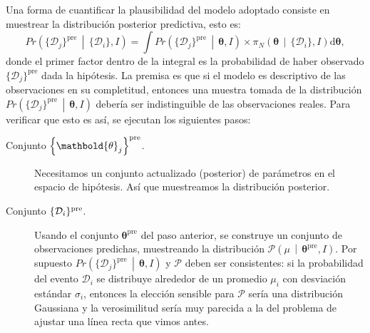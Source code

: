 \documentclass[a4paper,twoside]{article}
\newcommand{\hip}{\ensuremath{\mathbold{\theta}}\xspace}
\newcommand{\dat}[1][i]{\ensuremath{\{\mathcal{D}_{#1}\}}\xspace}
\newcommand{\pos}[2]{\ensuremath{\pi_N\left(#1\,\middle|\, #2\right)}\xspace}
\newcommand{\pro}[2]{\ensuremath{Pr\left(#1\,\middle|\, #2\right)}\xspace}
\newcommand{\set}[1]{\ensuremath{\left\{#1\right\}}\xspace}
\begin{document}
Una forma de cuantificar la plausibilidad del modelo adoptado consiste en muestrear la distribución
posterior predictiva, esto es:
%
\begin{equation}
\pro{\dat[j]^\text{pre}}{\dat,I} = \int\pro{\dat[j]^\text{pre}}{\hip,I}\times\pos{\hip}{\dat,I}\text{d}\hip,
\end{equation}
%
donde el primer factor dentro de la integral es la probabilidad de haber observado
$\dat[j]^\text{pre}$ dada la hipótesis. La premisa es que si el modelo es descriptivo de las
observaciones en su completitud, entonces una muestra tomada de la distribución
$\pro{\dat[j]^\text{pre}}{\hip,I}$ debería ser indistinguible de las observaciones reales. Para
verificar que esto es así, se ejecutan los siguientes pasos:
%
\begin{description}
%
\item[Conjunto $\set{\hip_j}^{\rm pre}$.] Necesitamos un conjunto actualizado (posterior) de
parámetros en el espacio de hipótesis. Así que muestreamos la distribución posterior.
%
\item[Conjunto $\dat^{\rm pre}$.] Usando el conjunto $\hip^\text{pre}$ del paso anterior, se
construye un conjunto de observaciones predichas, muestreando la distribución
$\mathcal{P}\left(\mu\,\middle|\,\hip^\text{pre},I\right)$. Por supuesto
$\pro{\dat[j]^\text{pre}}{\hip,I}$ y $\mathcal{P}$ deben ser consistentes: si la probabilidad del
evento $\mathcal{D}_i$ se distribuye alrededor de un promedio $\mu_i$ con desviación estándar
$\sigma_i$, entonces la elección sensible para $\mathcal{P}$ sería una distribución Gaussiana y la
verosimilitud sería muy parecida a la del problema de ajustar una línea recta que vimos antes.
%
\end{description}

\end{document}
